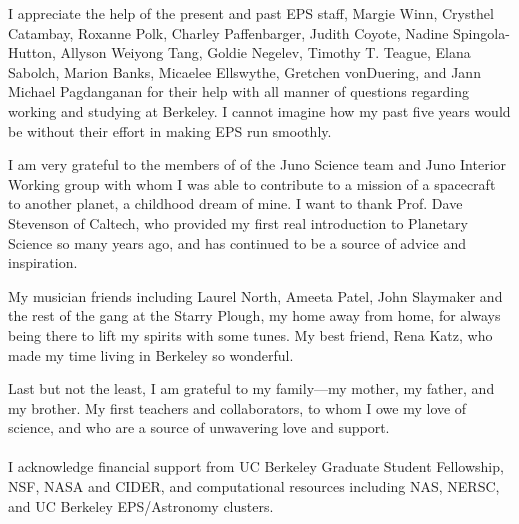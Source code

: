 \documentclass[phd,12pt]{ucbthesis}
\begin{document}
\begin{frontmatter}
\begin{acknowledgements}
I appreciate the help of the present and past EPS staff, Margie Winn, Crysthel
Catambay, Roxanne Polk, Charley Paffenbarger, Judith Coyote, Nadine Spingola-Hutton,
Allyson Weiyong Tang, Goldie Negelev, Timothy T. Teague, Elana Sabolch, Marion Banks,
Micaelee Ellswythe, Gretchen vonDuering, and Jann Michael Pagdanganan for their help
with all manner of questions regarding working and studying at Berkeley.  I cannot
imagine how my past five years would be without their effort in making EPS run
smoothly.

I am very grateful to the members of of the Juno Science team and Juno Interior
Working group with whom I was able to contribute to a mission of a spacecraft to
another planet, a childhood dream of mine.
I want to thank Prof. Dave Stevenson of Caltech, who provided my first real introduction
to Planetary Science so many years ago, and has continued to be a source of advice
and inspiration.

My musician friends including Laurel North, Ameeta Patel,  John
Slaymaker and the rest of the gang at the Starry Plough, my home away from home, for
always being there to lift my spirits with some tunes.
My best friend, Rena Katz, who made my time living in Berkeley so wonderful.

Last but not the least, I am grateful to my family---my mother, my father, and my
brother. My first teachers and collaborators, to whom I owe my love of science, and
who are a source of unwavering love and support. \\\\

I acknowledge financial support from UC Berkeley Graduate Student Fellowship, NSF,
NASA and CIDER, and computational resources including NAS, NERSC, and UC Berkeley
EPS/Astronomy clusters.

\end{acknowledgements}

\end{frontmatter}

\pagestyle{headings}














%
%
%

%
%



\end{document}
